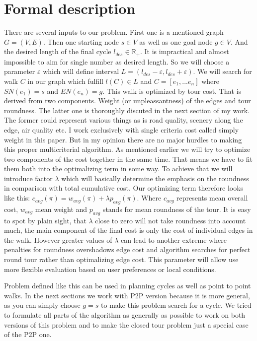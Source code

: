 \documentclass{ctuthesis}
\begin{document}
\section{Formal description}
There are several inputs to our problem. First one is a mentioned graph \(G=(V, E)\). Then one starting node \(s \in V\) as well as one goal node \(g \in V\). And the desired length of the final cycle \(l_{des} \in \mathbb{R_+}\). It is impractical and almost impossible to aim for single number as desired length. So we will choose a parameter \(\varepsilon\) which will define interval \(L = (l_{des}-\varepsilon, l_{des}+\varepsilon)\). We will search for walk \(C\) in our graph which fulfill \(l(C) \in L\) and \(C = [e_1, ... e_n]\) where \(SN(e_1)= s\) and \(EN(e_n)= g\). This walk is optimized by tour cost. That is derived from two components. Weight (or unpleassantness) of the edges and tour roundness. The latter one is thoroughly discuted in the next section of my work. The former could represent various things as is road quality, scenery along the edge, air quality etc. I work exclusively with single criteria cost called simply weight in this paper. But in my opinion there are no major hurdles to making this proper multicriterial algorithm.
As mentioned earlier we will try to optimize two components of the cost together in the same time. That means we have to fit them both into the optimalizing term in some way. To achieve that we will introduce factor \(\lambda\) which will basically determine the emphasis on the roundness in comparison with total cumulative cost. Our optimizing term therefore looks like this: \(c_{avg}(\pi) = w_{avg}(\pi) + \lambda p_{avg}(\pi)\). Where \(c_{avg}\) represents mean overall cost, \(w_{avg}\) mean weight and \(p_{avg}\) stands for mean roundness of the tour. It is easy to spot by plain sight, that \(\lambda\) close to zero will not take roundness into account much, the main component of the final cost is only the cost of individual edges in the walk. However greater values of \(\lambda\) can lead to another extreme where penalties for roundness overshadows edge cost and algorithm searches for perfect round tour rather than optimalizing edge cost. This parameter will allow use more flexible evaluation based on user preferences or local conditions. \par
Problem defined like this can be used in planning cycles as well as point to point walks. In the next sections we work with P2P version because it is more general, as you can simply choose \(g = s\) to make this problem search for a cycle. We tried to formulate all parts of the algorithm as generally as possible to work on both versions of this problem and to make the closed tour problem just a special case of the P2P one.
	
\end{document}
